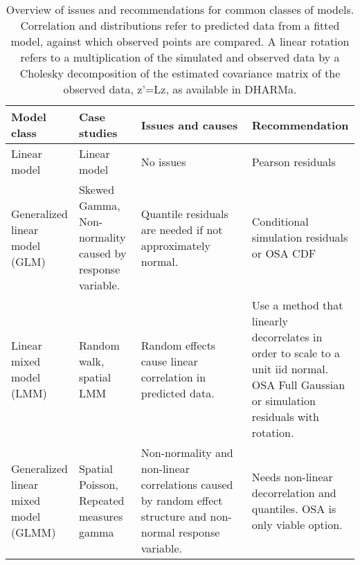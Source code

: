 \begin{table}[h]
    \caption{Overview of issues and recommendations for common classes of models. Correlation and distributions refer to predicted data from a fitted model, against which observed points are compared. A linear rotation refers to a multiplication of the simulated and observed data by a Cholesky decomposition of the estimated covariance matrix of the observed data, z’=Lz, as available in DHARMa.}
    \begin{tabular}{p{0.18\linewidth} p{0.18\linewidth}p{0.33\linewidth}p{0.33\linewidth}}
    \toprule
    Model class & Case studies & Issues and causes & Recommendation\\
    \hline
    Linear model & Linear model & No issues & Pearson residuals \\
    Generalized linear model (GLM) &
    Skewed Gamma, Non-normality caused by response variable. &
    Quantile residuals are needed if not approximately normal. &
    Conditional simulation residuals or OSA CDF \\
    Linear mixed model (LMM) &
    Random walk, spatial LMM &
    Random effects cause linear correlation in predicted data. &
    Use a method that linearly decorrelates in order to scale to a unit iid normal. OSA Full Gaussian  or simulation residuals with rotation. \\
    Generalized linear mixed model (GLMM) &
    Spatial Poisson, Repeated measures gamma &
    Non-normality and non-linear correlations caused by random effect structure and non-normal response variable. &
    Needs non-linear decorrelation and quantiles. OSA is only viable option.\\
    \bottomrule
    \end{tabular}
    \end{table}

